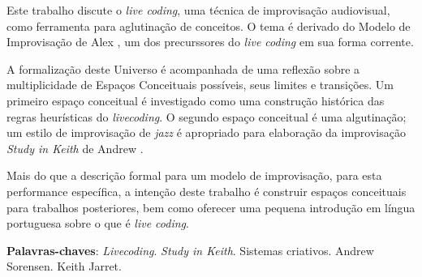 \setlength{\absparsep}{18pt} %
\begin{resumo}
Este trabalho discute o \emph{live coding},  uma técnica de improvisação audiovisual, como ferramenta para aglutinação de conceitos. O tema é derivado do Modelo de Improvisação de Alex , um dos precurssores do \emph{live coding} em sua forma corrente.

A formalização deste Universo é acompanhada de uma reflexão sobre a multiplicidade de Espaços Conceituais possíveis, seus limites e transições. Um primeiro espaço conceitual é investigado como uma construção histórica das regras heurísticas do \emph{livecoding}. O segundo espaço conceitual é uma algutinação; um estilo de improvisação de \emph{jazz} é apropriado para elaboração da improvisação \emph{Study in Keith} de Andrew .

Mais do que a descrição formal para um modelo de improvisação, para esta performance específica, a intenção deste trabalho é construir espaços conceituais para trabalhos posteriores, bem como oferecer uma pequena introdução em língua portuguesa sobre o que é \emph{live coding}. 

\vspace{\onelineskip}
\noindent
\textbf{Palavras-chaves}: \textit{Livecoding}. \emph{Study in Keith}. Sistemas criativos. Andrew Sorensen. Keith Jarret.
\end{resumo}

\begin{comment}
\begin{resumo}[Abstract]
 \begin{otherlanguage*}{english}

   \vspace{\onelineskip}
 
   \noindent 
   \textbf{Key-words}: latex. abntex. text editoration.
 \end{otherlanguage*}
\end{resumo}

\begin{comment}

\begin{resumo}[Résumé]
 \begi'n{otherlanguage*}{french}
    Il s'agit d'un résumé en français.
 
   \textbf{Mots-clés}: latex. abntex. publication de textes.
 \end{otherlanguage*}
\end{resumo}

\begin{resumo}[Resumen]
 \begin{otherlanguage*}{spanish}
   Este es el resumen en español.
  
   \textbf{Palabras clave}: latex. abntex. publicación de textos.
 \end{otherlanguage*}
\end{resumo}
\end{comment}